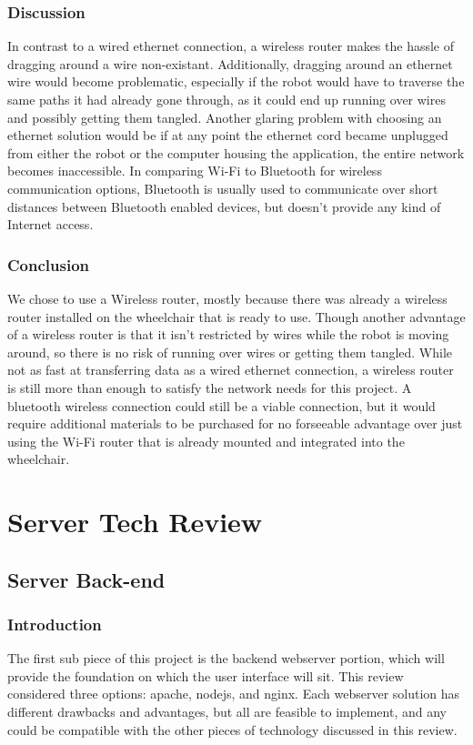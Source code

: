 \documentclass[onecolumn, draftclsnofoot,10pt, compsoc]{report}
\begin{document}
\subsection{Discussion}
In contrast to a wired ethernet connection, a wireless router makes the hassle of dragging around a wire non-existant. Additionally, dragging around an ethernet wire would become problematic, especially if the robot would have to traverse the same paths it had already gone through, as it could end up running over wires and possibly getting them tangled. Another glaring problem with choosing an ethernet solution would be if at any point the ethernet cord became unplugged from either the robot or the computer housing the application, the entire network becomes inaccessible. In comparing Wi-Fi to Bluetooth for wireless communication options, Bluetooth is usually used to communicate over short distances between Bluetooth enabled devices, but doesn't provide any kind of Internet access.\cite{Bluetooth_And_Wifi_Difference}

\subsection{Conclusion}
We chose to use a Wireless router, mostly because there was already a wireless router installed on the wheelchair that is ready to use. Though another advantage of a wireless router is that it isn't restricted by wires while the robot is moving around, so there is no risk of running over wires or getting them tangled. While not as fast at transferring data as a wired ethernet connection, a wireless router is still more than enough to satisfy the network needs for this project. A bluetooth wireless connection could still be a viable connection, but it would require additional materials to be purchased for no forseeable advantage over just using the Wi-Fi router that is already mounted and integrated into the wheelchair.

\chapter{Server Tech Review}
\minitoc
\section{Server Back-end}
\subsection{Introduction}
The first sub piece of this project is the backend webserver portion, which will provide the foundation on which the user
interface will sit. This review considered three options: apache, nodejs, and nginx. Each webserver solution has different drawbacks and advantages, but all are feasible to implement, and any could be compatible with the other pieces of technology discussed in this review.
\end{document}
